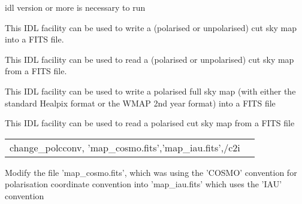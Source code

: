 \begin{related}
  \begin{sulist}{} %
  \item[idl] version \idlversion or more is necessary to run \facname
  \item[\htmlref{write\_fits\_cut4}{idl:write_fits_cut4}] This \healpix IDL
  facility can be used to write a (polarised or unpolarised) cut sky map into a
  FITS file.
  \item[\htmlref{read\_fits\_cut4}{idl:read_fits_cut4}] This \healpix IDL
  facility can be used to read a (polarised or unpolarised) cut sky map from a
  FITS file.
  \item[\htmlref{write\_tqu}{idl:write_tqu}] This \healpix IDL
  facility can be used to write a polarised full sky map (with either the
  standard Healpix format or the WMAP 2nd year format) into a
  FITS file
  \item[\htmlref{read\_tqu}{idl:read_tqu}] This \healpix IDL
  facility can be used to read a polarised cut sky map from a
  FITS file
  \end{sulist}
\end{related}


\begin{example}
{
\begin{tabular}{ll} %
change\_polcconv, 'map\_cosmo.fits','map\_iau.fits',/c2i
\end{tabular}
}
{ Modify the file 'map\_cosmo.fits', which was using the 'COSMO' convention for
  polarisation coordinate convention into 'map\_iau.fits' which uses the 'IAU' convention
}
\end{example}


